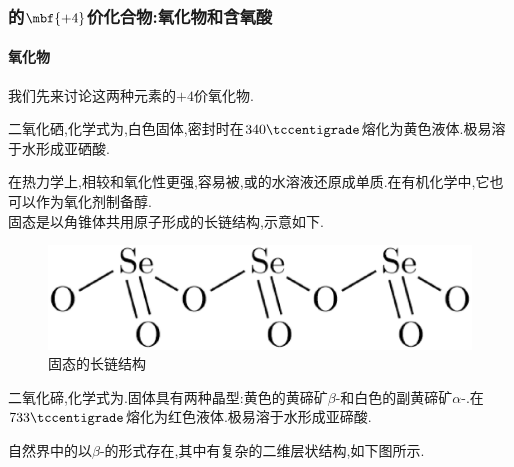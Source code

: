 \documentclass{ctexart}
\begin{document}
\subsubsection{的$\mbf{+4}$价化合物:氧化物和含氧酸}
\paragraph{氧化物}我们先来讨论这两种元素的$+4$价氧化物.
\begin{substance}[\ce{SeO2}]
    二氧化硒,化学式为,白色固体,密封时在$340\tccentigrade$熔化为黄色液体.极易溶于水形成亚硒酸.
\end{substance}
在热力学上,相较和氧化性更强,容易被,或的水溶液还原成单质.在有机化学中,它也可以作为氧化剂制备醇.\\
\indent 固态是以角锥体共用原子形成的长链结构,示意如下.
\begin{figure}[H]
    \centering\includegraphics[scale=0.25]{picture/SeO2.eps}
    \caption{固态的长链结构}
\end{figure}
\begin{substance}[\ce{TeO2}]
    二氧化碲,化学式为.固体具有两种晶型:黄色的黄碲矿$\beta$-和白色的副黄碲矿$\alpha$-.在$733\tccentigrade$熔化为红色液体.极易溶于水形成亚碲酸.
\end{substance}
自然界中的以$\beta$-的形式存在,其中有复杂的二维层状结构,如下图所示.
\end{document}
